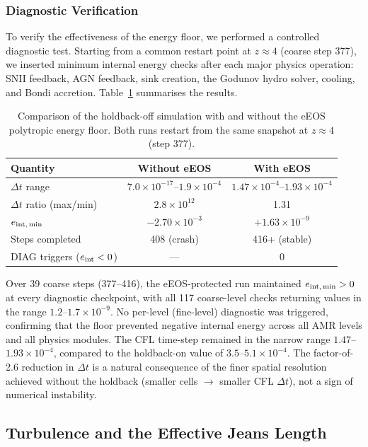 \documentclass[fleqn,usenatbib]{mnras}
\begin{document}
\subsubsection{Diagnostic Verification}
\label{sec:eeos_diag}

To verify the effectiveness of the energy floor, we performed a
controlled diagnostic test.  Starting from a common restart point at
$z \approx 4$ (coarse step 377), we inserted minimum internal energy
checks after each major physics operation: SNII feedback, AGN
feedback, sink creation, the Godunov hydro solver, cooling, and Bondi
accretion.  Table~\ref{tab:eeos_diag} summarises the results.

\begin{table}
\centering
\caption{Comparison of the holdback-off simulation with and without
the eEOS polytropic energy floor.  Both runs restart from the same
snapshot at $z \approx 4$ (step 377).}
\label{tab:eeos_diag}
\begin{tabular}{lcc}
\toprule
Quantity & Without eEOS & With eEOS \\
\midrule
$\Delta t$ range & $7.0\times 10^{-17}$--$1.9\times 10^{-4}$ &
  $1.47\times 10^{-4}$--$1.93\times 10^{-4}$ \\
$\Delta t$ ratio (max/min) & $2.8\times 10^{12}$ & 1.31 \\
$e_{\rm int,\,min}$ & $-2.70\times 10^{-3}$ & $+1.63\times 10^{-9}$ \\
Steps completed & 408 (crash) & 416+ (stable) \\
DIAG triggers ($e_{\rm int} < 0$) & --- & 0 \\
\bottomrule
\end{tabular}
\end{table}

Over 39 coarse steps (377--416), the eEOS-protected run maintained
$e_{\rm int,\,min} > 0$ at every diagnostic checkpoint, with all 117
coarse-level checks returning values in the range $1.2$--$1.7\times
10^{-9}$.  No per-level (fine-level) diagnostic was triggered,
confirming that the floor prevented negative internal energy across
all AMR levels and all physics modules.  The CFL time-step remained
in the narrow range $1.47$--$1.93\times 10^{-4}$, compared to the
holdback-on value of $3.5$--$5.1\times 10^{-4}$.  The factor-of-2.6
reduction in $\Delta t$ is a natural consequence of the finer spatial
resolution achieved without the holdback (smaller cells $\rightarrow$
smaller CFL $\Delta t$), not a sign of numerical instability.


\subsection{Turbulence and the Effective Jeans Length}
\label{sec:turbulence}
\end{document}
